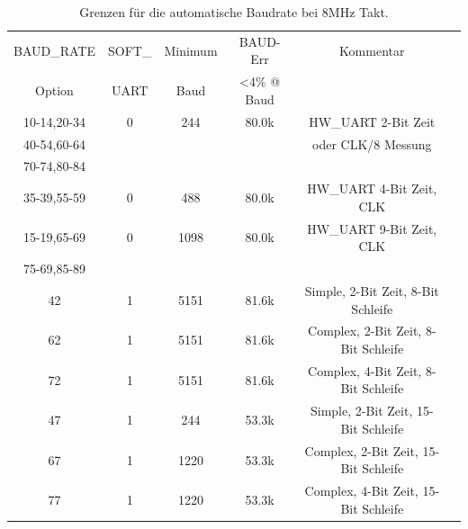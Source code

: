 \begin{table}[H]
  \begin{center}
    \begin{tabular}{| c | c | c | c | c | c |}
    \hline
   BAUD\_RATE  & SOFT\_ & Minimum & BAUD-Err   & Kommentar  \\
   Option      & UART   & Baud    & \textless 4\% @ Baud &  \\
    \hline
  10-14,20-34  &  0     &  244      &   80.0k  & HW\_UART 2-Bit Zeit  \\
  40-54,60-64  &        &           &          & oder CLK/8 Messung         \\
  70-74,80-84  &        &           &          &                            \\
    \hline
  35-39,55-59  &  0     &  488      &   80.0k  & HW\_UART 4-Bit Zeit, CLK \\
    \hline
  15-19,65-69  &  0     &  1098     &   80.0k  & HW\_UART 9-Bit Zeit, CLK \\
  75-69,85-89  &        &           &          &                          \\
    \hline
    42         &  1     &  5151     &   81.6k  & Simple, 2-Bit Zeit, 8-Bit Schleife  \\
    \hline
    62         &  1     &  5151     &   81.6k  & Complex, 2-Bit Zeit, 8-Bit Schleife  \\
    \hline
    72         &  1     &  5151     &   81.6k  & Complex, 4-Bit Zeit, 8-Bit Schleife  \\
    \hline
    47         &  1     &  244      &   53.3k  &  Simple, 2-Bit Zeit, 15-Bit Schleife\\
    \hline
    67         &  1     &  1220     &   53.3k  &  Complex, 2-Bit Zeit, 15-Bit Schleife \\
    \hline
    77         &  1     &  1220     &   53.3k  & Complex, 4-Bit Zeit, 15-Bit Schleife \\
    \hline
    \end{tabular}
  \end{center}
  \caption{Grenzen für die automatische Baudrate bei 8MHz Takt.}
  \label{tab:AutoBaud8}
\end{table}

